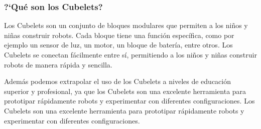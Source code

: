 \subsubsection{?`Qu\'e son los Cubelets?}
\label{ssub:queSonCubelets}
    Los Cubelets son un conjunto de bloques modulares que permiten a los ni\~nos y ni\~nas
        construir robots. Cada bloque tiene una funci\'on espec\'ifica, como por ejemplo
        un sensor de luz, un motor, un bloque de bater\'ia, entre otros. Los Cubelets
        se conectan f\'acilmente entre s\'i, permitiendo a los ni\~nos y ni\~nas
        construir robots de manera r\'apida y sencilla.
        
    \vskip 0.5cm
    Adem\'as podemos extrapolar el uso de los Cubelets a niveles de educaci\'on superior y
        profesional, ya que los Cubelets son una excelente herramienta para prototipar
        r\'apidamente robots y experimentar con diferentes configuraciones. Los Cubelets
        son una excelente herramienta para prototipar r\'apidamente robots y experimentar
        con diferentes configuraciones.
    